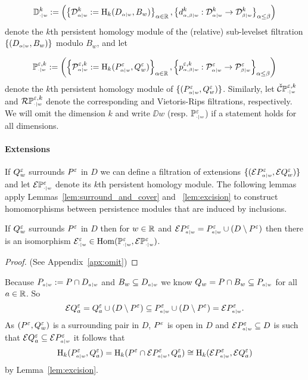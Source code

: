 \[ \DD{w}^k := \left(\left\{\D{w}{\alpha}^k := \hom_k(D\subi{w}{\alpha},B_w)\right\}_{\alpha\in\R},\left\{d\subi{w}{\alpha,\beta}^k : \D{w}{\alpha}^k\to\D{w}{\beta}^k\right\}_{\alpha\leq\beta}\right)\]
denote the $k$th persistent homology module of the (relative) sub-levelset filtration $\{(D\subi{w}{\alpha},B_w)\}$ modulo $B_w$, and let

\[\PP{w}{\e,k} := \left(\left\{\P{w}{\e,k}{\alpha} := \hom_k(P\subi{w}{\alpha}^\e,Q_w^\e)\right\}_{\alpha\in\R}, \left\{p\subi{w}{\alpha,\beta}^{\e,k} : \P{w}{\e}{\alpha}\to\P{w}{\e}{\beta}\right\}_{\alpha\leq\beta}\right)\]
denote the $k$th persistent homology module of $\{(P\subi{w}{\alpha}^\e,Q_w^\e)\}$.
Similarly, let $\CPP{w}{\e,k}$ and $\RPP{w}{\e,k}$ denote the corresponding \Cech and Vietoris-Rips filtrations, respectively.
We will omit the dimension $k$ and write $\DD{w}$ (resp. $\PP{w}{\e}$) if a statement holds for all dimensions.

\paragraph{Extensions}

If $Q_w^\e$ surrounds $P^\e$ in $D$ we can define a filtration of extensions $\{(\ext{P\subi{w}{\alpha}^\e},\ext{Q_w^\e})\}$ and let $\ext{\PP{w}{\e}}$ denote its $k$th persistent homology module.
The following lemmas apply Lemmas~\ref{lem:surround_and_cover} and ~\ref{lem:excision} to construct homomorphisms between persistence modules that are induced by inclusions.

\begin{lemma}\label{lem:extension_apply}
  If $Q_w^\e$ surrounds $P^\e$ in $D$ then for $w\in\R$ and $\ext{P\subi{w}{a}^\e} = P\subi{w}{a}^\e \cup (D\setminus P^\e)$ then there is an isomorphism $\E\subi{w}{\cdot}^\e \in \Hom(\PP{w}{\e},\ext{\PP{w}{\e}})$.
\end{lemma}\begin{proof}
  (See Appendix~\ref{apx:omit})
\end{proof}
\proofatend
  Because $P\subi{w}{a} := P\cap D\subi{w}{a}$ and $B_w\subseteq D\subi{w}{a}$ we know $Q_w = P\cap B_w \subseteq P\subi{w}{a}$ for all $a\in\R$.
  So
  \[\ext{Q^\e_a} = Q^\e_a\cup (D\setminus P^\e) \subseteq P\subi{w}{a}^\e \cup (D\setminus P^\e) = \ext{P\subi{w}{a}^\e}.\]
  As $(P^\e, Q_w^\e)$ is a surrounding pair in $D$, $P^\e$ is open in $D$ and $\ext{P\subi{w}{a}^\e}\subseteq D$ is such that $\ext{Q^\e_a}\subseteq \ext{P\subi{w}{a}^\e}$ it follows that
  \[\hom_k(P\subi{w}{a}^\e, Q^\e_a) = \hom_k(P^\e\cap \ext{P\subi{w}{a}^\e}, Q^\e_a) \cong\hom_k(\ext{P\subi{w}{a}^\e}, \ext{Q^\e_a})\]
  by Lemma~\ref{lem:excision}.

